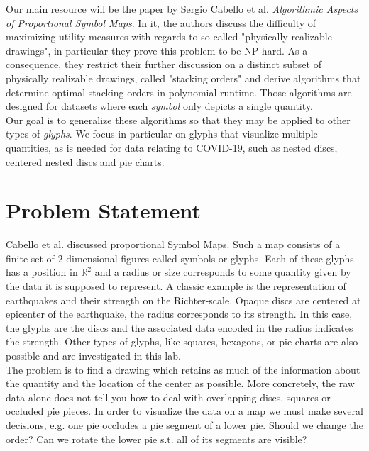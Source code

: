 \documentclass[a4paper,11pt]{article}
\begin{document}
Our main resource will be the paper by Sergio Cabello et al. \textit{Algorithmic Aspects of Proportional Symbol Maps}. In it, the authors discuss the difficulty of maximizing utility measures with regards to so-called "physically realizable drawings", in particular they prove this problem to be NP-hard. As a consequence, they restrict their further discussion on a distinct subset of physically realizable drawings, called "stacking orders" and derive algorithms that determine optimal stacking orders in polynomial runtime. Those algorithms are designed for datasets where each \textit{symbol} only depicts a single quantity.\\

Our goal is to generalize these algorithms so that they may be applied to other types of \textit{glyphs}. We focus in particular on glyphs that visualize multiple quantities, as is needed for data relating to COVID-19, such as nested discs, centered nested discs and pie charts.

\newpage

\section{Problem Statement}
Cabello et al. discussed proportional Symbol Maps. Such a map consists of a finite set of $2$-dimensional figures called symbols or glyphs. Each of these glyphs has a position in $\mathbb{R}^2$ and a radius or size corresponds to some quantity given by the data it is supposed to represent. A classic example is the representation of earthquakes and their strength on the Richter-scale. Opaque discs are centered at epicenter of the earthquake, the radius corresponds to its strength. In this case, the glyphs are the discs and the associated data encoded in the radius indicates the strength. Other types of glyphs, like squares, hexagons, or pie charts are also possible and are investigated in this lab.\\

The problem is to find a drawing which retains as much of the information about the quantity and the location of the center as possible. More concretely, the raw data alone does not tell you how to deal with overlapping discs, squares or occluded pie pieces. In order to visualize the data on a map we must make several decisions, e.g. one pie occludes a pie segment of a lower pie. Should we change the order? Can we rotate the lower pie s.t. all of its segments are visible?\\
\end{document}
